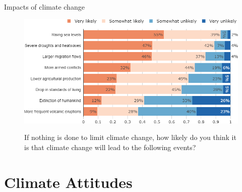 \documentclass[aspectratio=169,9pt,dvipsnames]{beamer}
\begin{document}
\begin{frame}{Impacts of climate change}%
\begin{figure}[h!]
\centering
\caption{If nothing is done to limit climate change, how likely do you think it is that climate change will lead to the following events?}
\includegraphics[width=.85\textwidth]{../figures/DK/CC_impacts_DK.png} \\
\end{figure}
\end{frame}

\section{Climate Attitudes}
\end{document}
